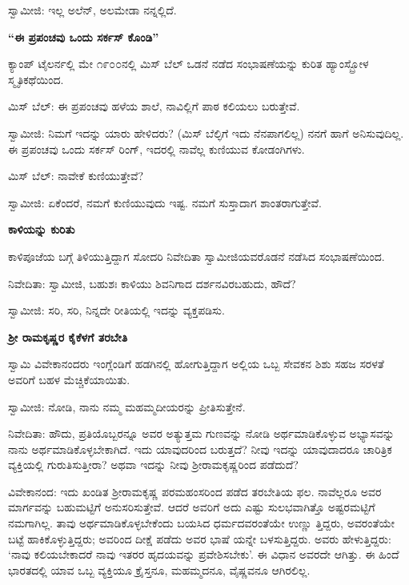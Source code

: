 ಸ್ವಾಮೀಜಿ: ಇಲ್ಲ ಅಲೆನ್, ಅಲಮೇಡಾ ನನ್ನಲ್ಲಿದೆ.

\begin{center}
\textbf{“ಈ ಪ್ರಪಂಚವು ಒಂದು ಸರ್ಕಸ್ ಕೊಂಡಿ”}
\end{center}

ಕ್ಯಾಂಪ್ ಟೈಲರ್ನಲ್ಲಿ ಮೇ ೧೯೦೦ನಲ್ಲಿ ಮಿಸ್ ಬೆಲ್ ಒಡನೆ ನಡೆದ ಸಂಭಾಷಣೆಯನ್ನು ಕುರಿತ ಹ್ಯಾಂಸ್ಬ್ರೋಳ ಸ್ಮೃತಿಕಥೆಯಿಂದ.

ಮಿಸ್ ಬೆಲ್: ಈ ಪ್ರಪಂಚವು ಹಳೆಯ ಶಾಲೆ, ನಾವಿಲ್ಲಿಗೆ ಪಾಠ ಕಲಿಯಲು ಬರುತ್ತೇವೆ.

ಸ್ವಾಮೀಜಿ: ನಿಮಗೆ ಇದನ್ನು ಯಾರು ಹೇಳಿದರು? (ಮಿಸ್ ಬೆಲ್ಳಿಗೆ ಇದು ನೆನಪಾಗಲಿಲ್ಲ) ನನಗೆ ಹಾಗೆ ಅನಿಸುವುದಿಲ್ಲ. ಈ ಪ್ರಪಂಚವು ಒಂದು ಸರ್ಕಸ್ ರಿಂಗ್, ಇದರಲ್ಲಿ ನಾವೆಲ್ಲ ಕುಣಿಯುವ ಕೋಡಂಗಿಗಳು.

ಮಿಸ್ ಬೆಲ್: ನಾವೇಕೆ ಕುಣಿಯುತ್ತೇವೆ?

ಸ್ವಾಮೀಜಿ: ಏಕೆಂದರೆ, ನಮಗೆ ಕುಣಿಯುವುದು ಇಷ್ಟ. ನಮಗೆ ಸುಸ್ತಾದಾಗ ಶಾಂತರಾಗುತ್ತೇವೆ.

\begin{center}
\textbf{ಕಾಳಿಯನ್ನು ಕುರಿತು}
\end{center}

ಕಾಳಿಪೂಜೆಯ ಬಗ್ಗೆ ತಿಳಿಯುತ್ತಿದ್ದಾಗ ಸೋದರಿ ನಿವೇದಿತಾ ಸ್ವಾಮೀಜಿಯವರೊಡನೆ ನಡೆಸಿದ ಸಂಭಾಷಣೆಯಿಂದ.

ನಿವೇದಿತಾ: ಸ್ವಾಮೀಜಿ, ಬಹುಶಃ ಕಾಳಿಯು ಶಿವನಿಗಾದ ದರ್ಶನವಿರಬಹುದು, ಹೌದೆ?

ಸ್ವಾಮೀಜಿ: ಸರಿ, ಸರಿ, ನಿನ್ನದೇ ರೀತಿಯಲ್ಲಿ ಇದನ್ನು ವ್ಯಕ್ತಪಡಿಸು.

\begin{center}
\textbf{ಶ‍್ರೀ ರಾಮಕೃಷ್ಣರ ಕೈಕೆಳಗೆ ತರಬೇತಿ}
\end{center}

ಸ್ವಾಮಿ ವಿವೇಕಾನಂದರು ಇಂಗ್ಲೆಂಡಿಗೆ ಹಡಗಿನಲ್ಲಿ ಹೋಗುತ್ತಿದ್ದಾಗ ಅಲ್ಲಿಯ ಒಬ್ಬ ಸೇವಕನ ಶಿಶು ಸಹಜ ಸರಳತೆ ಅವರಿಗೆ ಬಹಳ ಮೆಚ್ಚಿಕೆಯಾಯಿತು.

ಸ್ವಾಮೀಜಿ: ನೋಡಿ, ನಾನು ನಮ್ಮ ಮಹಮ್ಮದೀಯರನ್ನು ಪ್ರೀತಿಸುತ್ತೇನೆ.

ನಿವೇದಿತಾ: ಹೌದು, ಪ್ರತಿಯೊಬ್ಬರನ್ನೂ ಅವರ ಅತ್ಯುತ್ತಮ ಗುಣವನ್ನು ನೋಡಿ ಅರ್ಥಮಾಡಿಕೊಳ್ಳುವ ಅಭ್ಯಾಸವನ್ನು ನಾನು ಅರ್ಥಮಾಡಿಕೊಳ್ಳಬೇಕಾಗಿದೆ. ಇದು ಯಾವುದರಿಂದ ಬರುತ್ತದೆ? ನೀವು ಇದನ್ನು ಯಾವುದಾದರೂ ಚಾರಿತ್ರಿಕ ವ್ಯಕ್ತಿಯಲ್ಲಿ ಗುರುತಿಸುತ್ತೀರಾ? ಅಥವಾ ಇದನ್ನು ನೀವು ಶ‍್ರೀರಾಮಕೃಷ್ಣರಿಂದ ಪಡೆದುದೆ?

ವಿವೇಕಾನಂದ: ಇದು ಖಂಡಿತ ಶ‍್ರೀರಾಮಕೃಷ್ಣ ಪರಮಹಂಸರಿಂದ ಪಡೆದ ತರಬೇತಿಯ ಫಲ. ನಾವೆಲ್ಲರೂ ಅವರ ಮಾರ್ಗವನ್ನು ಬಹುಮಟ್ಟಿಗೆ ಅನುಸರಿಸುತ್ತೇವೆ. ಆದರೆ ಅವರಿಗೆ ಅದು ಎಷ್ಟು ಸುಲಭವಾಗಿತ್ತೊ ಅಷ್ಟರಮಟ್ಟಿಗೆ ನಮಗಾಗಿಲ್ಲ. ತಾವು ಅರ್ಥಮಾಡಿಕೊಳ್ಳಬೇಕೆಂದು ಬಯಸಿದ ಧರ್ಮದವರಂತೆಯೇ ಉಣ್ಣು ತ್ತಿದ್ದರು, ಅವರಂತೆಯೇ ಬಟ್ಟೆ ಹಾಕಿಕೊಳ್ಳುತ್ತಿದ್ದರು; ಅವರಿಂದ ದೀಕ್ಷೆ ಪಡೆದು ಅವರ ಭಾಷೆ ಯನ್ನೇ ಬಳಸುತ್ತಿದ್ದರು. ಅವರು ಹೇಳುತ್ತಿದ್ದರು: ‘ನಾವು ಕಲಿಯಬೇಕಾದರೆ ನಾವು ಇತರರ ಹೃದಯವನ್ನು ಪ್ರವೇಶಿಸಬೇಕು’. ಈ ವಿಧಾನ ಅವರದೇ ಆಗಿತ್ತು. ಈ ಹಿಂದೆ ಭಾರತದಲ್ಲಿ ಯಾವ ಒಬ್ಬ ವ್ಯಕ್ತಿಯೂ ಕ್ರೈಸ್ತನೂ, ಮಹಮ್ಮದನೂ, ವೈಷ್ಣವನೂ ಆಗಿರಲಿಲ್ಲ.

